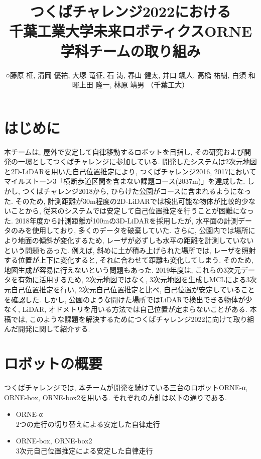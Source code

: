\documentclass[uplatex, twocolumn, 9pt]{jsproceedings}
\title{つくばチャレンジ2022における\\千葉工業大学未来ロボティクスORNE学科チームの取り組み}
\author{○藤原 柾, 清岡 優祐, 大塚 竜征, 石 涛, 春山 健太, 井口 颯人, 高橋 祐樹, 白須 和暉\newline 上田 隆一, 林原 靖男 （千葉工大）}
\affiliation{千葉工業大学未来ロボティクス学科チームα, box, box2}
\begin{document}
\maketitle


\section{はじめに}
本チームは, 屋外で安定して自律移動するロボットを目指し, その研究および開発の一環としてつくばチャレンジに参加している. 開発したシステムは2次元地図と2D-LiDARを用いた自己位置推定により, つくばチャレンジ2016, 2017においてマイルストーン3「横断歩道区間を含まない課題コース(2037m)」を達成した. しかし, つくばチャレンジ2018から, ひらけた公園がコースに含まれるようになった. そのため, 計測距離が30m程度の2D-LiDARでは検出可能な物体が比較的少ないことから, 従来のシステムでは安定して自己位置推定を行うことが困難になった. 2018年度から計測距離が100mの3D-LiDARを採用したが, 水平面の計測データのみを使用しており, 多くのデータを破棄していた. さらに, 公園内では場所により地面の傾斜が変化するため, レーザが必ずしも水平の距離を計測していないという問題もあった. 例えば, 斜めに土が積み上げられた場所では, レーザを照射する位置が上下に変化すると, それに合わせて距離も変化してしまう. そのため, 地図生成が容易に行えないという問題もあった. 2019年度は, これらの3次元データを有効に活用するため, 2次元地図ではなく, 3次元地図を生成しMCLによる3次元自己位置推定を行い, 2次元自己位置推定と比べ, 自己位置が安定していることを確認した. しかし, 公園のような開けた場所ではLiDARで検出できる物体が少なく, LiDAR, オドメトリを用いる方法では自己位置が定まらないことがある. 本稿では, このような課題を解決するためにつくばチャレンジ2022に向けて取り組んだ開発に関して紹介する. 

\section{ロボットの概要}
つくばチャレンジでは, 本チームが開発を続けている三台のロボットORNE-α, ORNE-box\cite{si-box}, ORNE-box2を用いる. それぞれの方針は以下の通りである. 
\begin{itemize}
  \item ORNE-α\\2つの走行の切り替えによる安定した自律走行
  \item ORNE-box, ORNE-box2\\3次元自己位置推定による安定した自律走行
\end{itemize}
\end{document}
